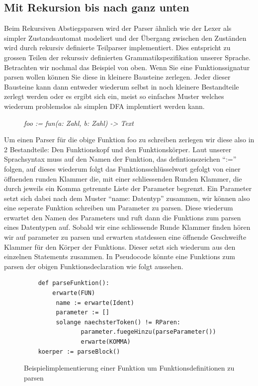 \documentclass[a4paper, 12pt]{article}
\begin{document}
\subsection{Mit Rekursion bis nach ganz unten}

Beim Rekursiven Abstiegsparsen wird der Parser \"ahnlich wie der Lexer als
simpler Zustandsautomat modeliert und der \"Ubergang zwischen den Zust\"anden wird durch rekursiv definierte Teilparser implementiert. Dies entspricht zu grossen Teilen der rekurssiv definierten Grammatikspezifikation unserer Sprache.
Betrachten wir nochmal das Beispiel von oben. Wenn Sie eine Funktionssignatur parsen
wollen k\"onnen Sie diese in kleinere Bausteine zerlegen. Jeder dieser Bausteine kann
dann entweder wiederum selbst in noch kleinere Bestandteile zerlegt werden
oder es ergibt sich ein, meist so einfaches Muster welches wiederum problemslos als simplen DFA implemtiert werden kann.
\begin{figure}[h]
    \emph{foo := fun(a: Zahl, b: Zahl) -> Text{}}
\end{figure}
Um einen Parser f\"ur die obige Funktion foo zu schreiben zerlegen wir diese
also in 2 Bestandteile: Den Funktionskopf und den Funktionsk\"orper. Laut unserer Sprachsyntax muss auf den Namen der Funktion, das defintionszeichen
“:=” folgen, auf dieses wiederum folgt das Funktionsschl\"usselwort gefolgt von
einer \"offnenden runden Klammer die, mit einer schliessenden Runden Klammer, die durch jeweils ein Komma getrennte Liste der Parameter begrenzt. Ein
Parameter setzt sich dabei nach dem Muster “name: Datentyp” zusammen, wir
k\"onnen also eine seperate Funktion schreiben um Parameter zu parsen. Diese
wiederum erwartet den Namen des Parameters und ruft dann die Funktions
zum parsen eines Datentypen auf. Sobald wir eine schliessende Runde Klammer finden h\"oren wir auf parameter zu parsen und erwarten statdessen eine
\"offnende Geschweifte Klammer f\"ur den K\"orper der Funktions. Dieser setzt
sich wiederum aus den einzelnen Statements zusammen.
In Pseudocode k\"onnte eine Funktions zum parsen der obigen Funktionsdeclaration wie folgt aussehen.

\begin{figure}[h]
    \caption{Beispielimplementierung einer Funktion um Funktionsdefinitionen zu parsen}
  \begin{verbatim}
    def parseFunktion():
        erwarte(FUN)
         name := erwarte(Ident)
         parameter := []
         solange naechsterToken() != RParen:
                parameter.fuegeHinzu(parseParameter())
                erwarte(KOMMA)
    koerper := parseBlock()
  \end{verbatim}
\end{figure}
\end{document}
